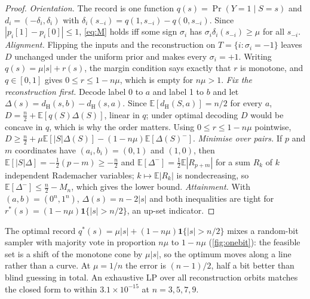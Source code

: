 \documentclass[sigconf,anonymous,acmthm=false]{aamas}
\theoremstyle{acmplain}
\theoremstyle{acmdefinition}
\newcommand{\E}{\mathbb{E}}
\newcommand{\dH}{d_{\mathrm{H}}}
\begin{document}
\begin{proof}
\emph{Orientation.} The record is one function $q(s)=\Pr(Y=1\mid S=s)$ and
$d_i=(-\delta_i,\delta_i)$ with $\delta_i(s_{-i})=q(1,s_{-i})-q(0,s_{-i})$. Since
$|p_i[1]-p_i[0]|\le1$, \eqref{eq:M} holds iff some sign $\sigma_i$ has
$\sigma_i\delta_i(s_{-i})\ge\mu$ for all $s_{-i}$. \emph{Alignment.} Flipping the inputs and
the reconstruction on $T=\{i:\sigma_i=-1\}$ leaves $D$ unchanged under the uniform prior and
makes every $\sigma_i=+1$. Writing $q(s)=\mu|s|+r(s)$, the margin condition says exactly that
$r$ is monotone, and $q\in[0,1]$ gives $0\le r\le1-n\mu$, which is empty for $n\mu>1$.
\emph{Fix the reconstruction first.} Decode label 0 to $a$ and label 1 to $b$ and let
$\Delta(s)=\dH(s,b)-\dH(s,a)$. Since $\E[\dH(S,a)]=n/2$ for every $a$,
$D=\frac n2+\E[q(S)\Delta(S)]$, linear in $q$; under optimal decoding $D$ would be concave in
$q$, which is why the order matters. Using $0\le r\le1-n\mu$ pointwise,
$D\ge\frac n2+\mu\E[|S|\Delta(S)]-(1-n\mu)\E[\Delta(S)^-]$. \emph{Minimise over pairs.} If
$p$ and $m$ coordinates have $(a_i,b_i)=(0,1)$ and $(1,0)$, then
$\E[|S|\Delta]=-\frac12(p-m)\ge-\frac n2$ and $\E[\Delta^-]=\frac12\E|R_{p+m}|$ for a sum $R_k$
of $k$ independent Rademacher variables; $k\mapsto\E|R_k|$ is nondecreasing, so
$\E[\Delta^-]\le\frac n2-M_n$, which gives the lower bound. \emph{Attainment.} With
$(a,b)=(0^n,1^n)$, $\Delta(s)=n-2|s|$ and both inequalities are tight for
$r^*(s)=(1-n\mu)\mathbf1\{|s|>n/2\}$, an up-set indicator.
\end{proof}

The optimal record $q^*(s)=\mu|s|+(1-n\mu)\mathbf1\{|s|>n/2\}$ mixes a random-bit sampler with
majority vote in proportion $n\mu$ to $1-n\mu$ (\cref{fig:onebit}): the feasible set is a
shift of the monotone cone by $\mu|s|$, so the optimum moves along a line rather than a
curve. At $\mu=1/n$ the error is $(n-1)/2$, half a bit better than blind guessing in total.
An exhaustive LP over all reconstruction orbits matches the closed form to within
$3.1\times10^{-15}$ at $n=3,5,7,9$.
\end{document}
